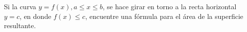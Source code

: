 \item Si la curva $y = f(x), a \le x \le b$, se hace girar en torno a la recta horizontal $y = c$, en donde $f(x) \le c$, encuentre una fórmula para el área de la superficie resultante.
